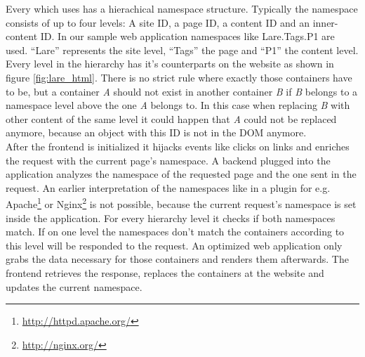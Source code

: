 Every \singlePageApplication{} which uses \lare{} has a hierachical namespace structure.
Typically the namespace consists of up to four levels: A site ID, a page ID, a content ID and an inner-content ID.
In our sample web application namespaces like Lare.Tags.P1 are used.
\enquote{Lare} represents the site level, \enquote{Tags} the page and \enquote{P1} the content level.
Every level in the hierarchy has it's counterparts on the website as shown in figure \ref{fig:lare_html}.
There is no strict rule where exactly those containers have to be, but a container \emph{A} should not exist in another container \emph{B} if \emph{B} belongs to a namespace level above the one \emph{A} belongs to.
In this case when replacing \emph{B} with other content of the same level it could happen that \emph{A} could not be replaced anymore, because an object with this ID is not in the DOM anymore.
\\
After the \lare{} frontend is initialized it hijacks events like clicks on links and enriches the request with the current page's namespace.
A \lare{} backend plugged into the application analyzes the namespace of the requested page and the one sent in the request.
An earlier interpretation of the \lare{} namespaces like in a \webServer{} plugin for e.g. Apache\footnote{\url{http://httpd.apache.org/}} or Nginx\footnote{\url{http://nginx.org/}} is not possible, because the current request's namespace is set inside the application.
For every hierarchy level it checks if both namespaces match.
If on one level the namespaces don't match the containers according to this level will be responded to the request.
An optimized web application only grabs the data necessary for those containers and renders them afterwards.
The \lare{} frontend retrieves the response, replaces the containers at the website and updates the current namespace.

